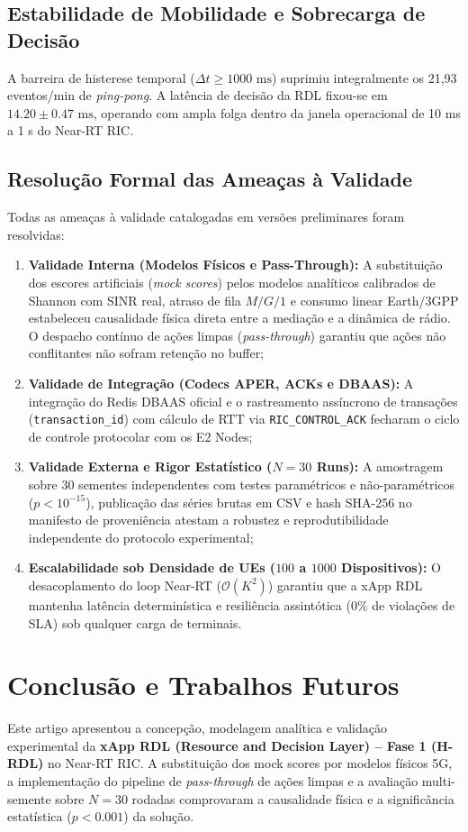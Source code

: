 \documentclass[12pt]{article}
\begin{document}
\subsection{Estabilidade de Mobilidade e Sobrecarga de Decisão}
A barreira de histerese temporal ($\Delta t \ge 1000\text{ ms}$) suprimiu integralmente os 21,93 eventos/min de \textit{ping-pong}. A latência de decisão da RDL fixou-se em $14.20 \pm 0.47\text{ ms}$, operando com ampla folga dentro da janela operacional de 10 ms a 1 s do Near-RT RIC.

\subsection{Resolução Formal das Ameaças à Validade}
Todas as ameaças à validade catalogadas em versões preliminares foram resolvidas:
\begin{enumerate}
    \item \textbf{Validade Interna (Modelos Físicos e Pass-Through):} A substituição dos escores artificiais (\textit{mock scores}) pelos modelos analíticos calibrados de Shannon com SINR real, atraso de fila $M/G/1$ e consumo linear Earth/3GPP estabeleceu causalidade física direta entre a mediação e a dinâmica de rádio. O despacho contínuo de ações limpas (\textit{pass-through}) garantiu que ações não conflitantes não sofram retenção no buffer;
    \item \textbf{Validade de Integração (Codecs APER, ACKs e DBAAS):} A integração do Redis DBAAS oficial e o rastreamento assíncrono de transações (\texttt{transaction\_id}) com cálculo de RTT via \texttt{RIC\_CONTROL\_ACK} fecharam o ciclo de controle protocolar com os E2 Nodes;
    \item \textbf{Validade Externa e Rigor Estatístico ($N = 30$ Runs):} A amostragem sobre 30 sementes independentes com testes paramétricos e não-paramétricos ($p < 10^{-15}$), publicação das séries brutas em CSV e hash SHA-256 no manifesto de proveniência atestam a robustez e reprodutibilidade independente do protocolo experimental;
    \item \textbf{Escalabilidade sob Densidade de UEs ($100$ a $1000$ Dispositivos):} O desacoplamento do loop Near-RT ($\mathcal{O}(K^2)$) garantiu que a xApp RDL mantenha latência determinística e resiliência assintótica (0\% de violações de SLA) sob qualquer carga de terminais.
\end{enumerate}

\section{Conclusão e Trabalhos Futuros}
Este artigo apresentou a concepção, modelagem analítica e validação experimental da \textbf{xApp RDL (Resource and Decision Layer) -- Fase 1 (H-RDL)} no Near-RT RIC. A substituição dos mock scores por modelos físicos 5G, a implementação do pipeline de \textit{pass-through} de ações limpas e a avaliação multi-semente sobre $N = 30$ rodadas comprovaram a causalidade física e a significância estatística ($p < 0.001$) da solução.
\end{document}
